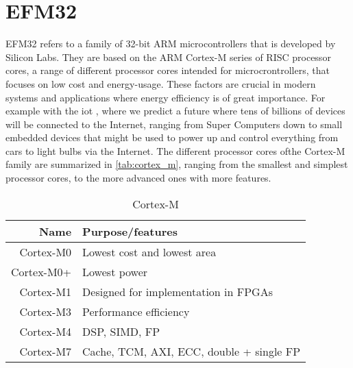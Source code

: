 
\section{EFM32}
\label{sub:emf32}

EFM32 refers to a family of 32-bit ARM microcontrollers that is developed by Silicon Labs.
They are based on the ARM Cortex-M series of RISC processor cores, a range of different processor cores intended for microcrontrollers, that focuses on low cost and energy-usage.
These factors are crucial in modern systems and applications where energy efficiency is of great importance.
For example with the \gls{iot} \cite{Valhouli2010}, where we predict a future where tens of billions of devices will be connected to the Internet, ranging from Super Computers down to small embedded devices that might be used to power up and control everything from cars to light bulbs via the Internet.
The different processor cores ofthe Cortex-M family are summarized in \autoref{tab:cortex_m}, ranging from the smallest and simplest processor cores, to the more advanced ones with more features.

\begin{table}
\begin{center}
\begin{tabular}{r|l}
\textbf{Name} & \textbf{Purpose/features}            \\
\hline
Cortex-M0 & Lowest cost and lowest area              \\
Cortex-M0+ & Lowest power                            \\
Cortex-M1 & Designed for implementation in FPGAs     \\
Cortex-M3 & Performance efficiency                   \\
Cortex-M4 & DSP, SIMD, FP                            \\
Cortex-M7 & Cache, TCM, AXI, ECC, double + single FP \\
\end{tabular}
\end{center}
\caption{Cortex-M}
\label{tab:cortex_m}
\end{table}

